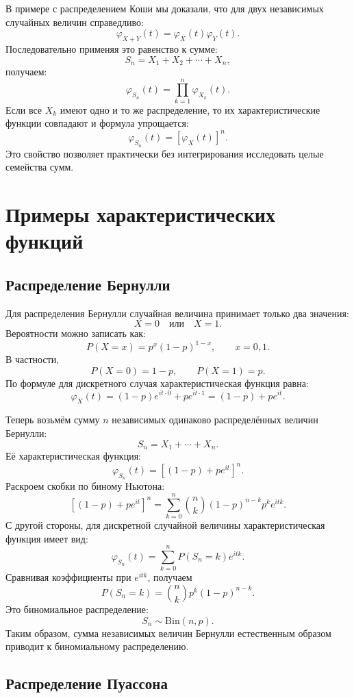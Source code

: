 \documentclass[
  russian,
  12pt,
  a4paper,
  a4paper,
  openany]{scrbook}
\begin{document}
В примере с распределением Коши мы доказали, что для двух независимых
случайных величин справедливо: \[\varphi_{X+Y}(t)
=
\varphi_X(t)\varphi_Y(t).\] Последовательно применяя это равенство к
сумме: \[S_n=X_1+X_2+\cdots+X_n,\] получаем: \[\boxed{
\varphi_{S_n}(t)
=
\prod_{k=1}^{n}\varphi_{X_k}(t).
}\] Если все \(X_k\) имеют одно и то же распределение, то их
характеристические функции совпадают и формула упрощается: \[\boxed{
\varphi_{S_n}(t)
=
\left[\varphi_X(t)\right]^n.
}\] Это свойство позволяет практически без интегрирования исследовать
целые семейства сумм.

\section{Примеры характеристических
функций}\label{ux43fux440ux438ux43cux435ux440ux44b-ux445ux430ux440ux430ux43aux442ux435ux440ux438ux441ux442ux438ux447ux435ux441ux43aux438ux445-ux444ux443ux43dux43aux446ux438ux439}

\subsection{Распределение
Бернулли}\label{ux440ux430ux441ux43fux440ux435ux434ux435ux43bux435ux43dux438ux435-ux431ux435ux440ux43dux443ux43bux43bux438}

Для распределения Бернулли случайная величина принимает только два
значения: \[X=0
\quad\text{или}\quad
X=1.\] Вероятности можно записать как: \[P(X=x)=p^x(1-p)^{1-x},
\qquad
x=0,1.\] В частности, \[P(X=0)=1-p,
\qquad
P(X=1)=p.\] По формуле для дискретного случая характеристическая функция
равна: \[\boxed{
\varphi_X(t)=(1-p)e^{it\cdot0}
+pe^{it\cdot1}=(1-p)+pe^{it}.}\]

Теперь возьмём сумму \(n\) независимых одинаково распределённых величин
Бернулли: \[S_n=X_1+\cdots+X_n.\] Её характеристическая функция:
\[\varphi_{S_n}(t)
=
\left[(1-p)+pe^{it}\right]^n.\] Раскроем скобки по биному Ньютона:
\[\left[(1-p)+pe^{it}\right]^n
=
\sum_{k=0}^{n}
\binom{n}{k}
(1-p)^{n-k}p^k e^{itk}.\] С другой стороны, для дискретной случайной
величины характеристическая функция имеет вид: \[\varphi_{S_n}(t)
=
\sum_{k=0}^{n}P(S_n=k)e^{itk}.\] Сравнивая коэффициенты при \(e^{itk}\),
получаем \[\boxed{
P(S_n=k)
=
\binom{n}{k}p^k(1-p)^{n-k}.
}\] Это биномиальное распределение: \[\boxed{
S_n\sim\mathrm{Bin}(n,p).
}\] Таким образом, сумма независимых величин Бернулли естественным
образом приводит к биномиальному распределению.

\subsection{Распределение
Пуассона}\label{ux440ux430ux441ux43fux440ux435ux434ux435ux43bux435ux43dux438ux435-ux43fux443ux430ux441ux441ux43eux43dux430}
\end{document}
